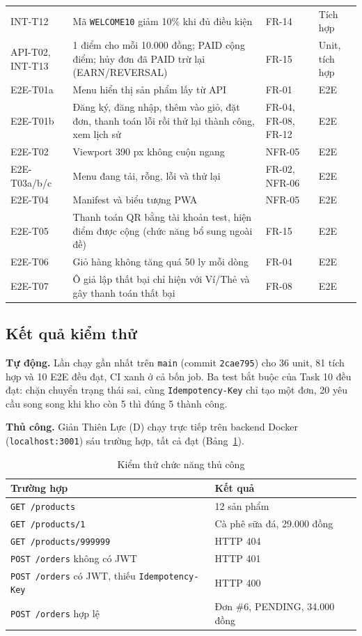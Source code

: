 \documentclass[a4paper]{article}
\begin{document}
{\begin{longtable}{@{}p{1.59cm}p{6.37cm}p{1.69cm}p{3.38cm}@{}}
INT-T12 & Mã \texttt{WELCOME10} giảm 10\% khi đủ điều kiện & FR-14 & Tích hợp \\
API-T02, INT-T13 & 1 điểm cho mỗi 10.000 đồng; PAID cộng điểm; hủy đơn đã PAID trừ lại (EARN/REVERSAL) & FR-15 & Unit, tích hợp \\
E2E-T01a & Menu hiển thị sản phẩm lấy từ API & FR-01 & E2E \\
E2E-T01b & Đăng ký, đăng nhập, thêm vào giỏ, đặt đơn, thanh toán lỗi rồi thử lại thành công, xem lịch sử & FR-04, FR-08, FR-12 & E2E \\
E2E-T02 & Viewport 390 px không cuộn ngang & NFR-05 & E2E \\
E2E-T03a/b/c & Menu đang tải, rỗng, lỗi và thử lại & FR-02, NFR-06 & E2E \\
E2E-T04 & Manifest và biểu tượng PWA & NFR-05 & E2E \\
E2E-T05 & Thanh toán QR bằng tài khoản test, hiện điểm được cộng (chức năng bổ sung ngoài đề) & FR-15 & E2E \\
E2E-T06 & Giỏ hàng không tăng quá 50 ly mỗi dòng & FR-04 & E2E \\
E2E-T07 & Ô giả lập thất bại chỉ hiện với Ví/Thẻ và gây thanh toán thất bại & FR-08 & E2E \\
\end{longtable}}

\subsection{Kết quả kiểm thử}\label{sec:se-ketquakt}
\textbf{Tự động.} Lần chạy gần nhất trên \texttt{main} (commit \texttt{2cae795}) cho 36 unit, 81 tích hợp và 10 E2E đều đạt, CI xanh ở cả bốn job. Ba test bắt buộc của Task 10 đều đạt: chặn chuyển trạng thái sai, cùng \texttt{Idempotency-Key} chỉ tạo một đơn, 20 yêu cầu song song khi kho còn 5 thì đúng 5 thành công.

\textbf{Thủ công.} Giản Thiên Lực (D) chạy trực tiếp trên backend Docker (\texttt{localhost:3001}) sáu trường hợp, tất cả đạt (Bảng~\ref{tab:manual}).
\begin{table}[htbp]\centering
\caption{Kiểm thử chức năng thủ công}\label{tab:manual}
\begin{tabular}{@{}p{6.4cm}p{6.4cm}@{}}\toprule
\textbf{Trường hợp} & \textbf{Kết quả} \\ \midrule
\texttt{GET /products} & 12 sản phẩm \\
\texttt{GET /products/1} & Cà phê sữa đá, 29.000 đồng \\
\texttt{GET /products/999999} & HTTP 404 \\
\texttt{POST /orders} không có JWT & HTTP 401 \\
\texttt{POST /orders} có JWT, thiếu \texttt{Idempotency-Key} & HTTP 400 \\
\texttt{POST /orders} hợp lệ & Đơn \#6, PENDING, 34.000 đồng \\ \bottomrule
\end{tabular}
\end{table}
\end{document}
